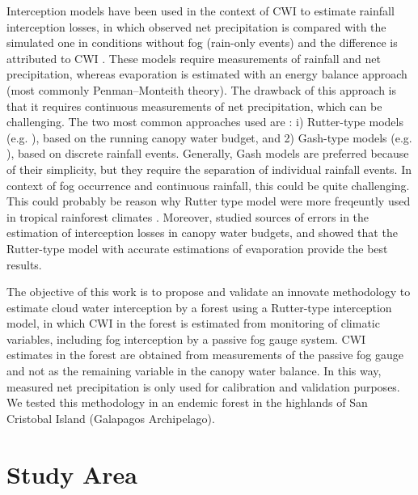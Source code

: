 \documentclass[a4paper,12pt]{article}
\begin{document}
\begin{linenumbers}
Interception models have been used in the context of CWI to estimate rainfall interception losses, in which observed net precipitation is compared with the simulated one in conditions without fog (rain-only events) and the difference is attributed to CWI \citep{Holwerdaetal2010, Pryetetal2012a}. These models require measurements of rainfall and net precipitation, whereas evaporation is estimated with an energy balance approach (most commonly Penman–Monteith theory). The drawback of this approach is that it requires continuous measurements of net precipitation, which can be challenging.  The two most common approaches used are \citep{Muzyloetal2009}:  i) Rutter-type models (e.g. \cite{Liu1997, Rutter1975}), based on the running canopy water budget, and 2) Gash-type models (e.g. \cite{Gash1979, Zengetal2000}), based on discrete rainfall events. Generally, Gash models are preferred because of their simplicity, but they require the separation of individual rainfall events. In context of fog occurrence and continuous rainfall, this could be quite challenging. This could probably be reason why Rutter type model were more freqeuntly used in tropical rainforest climates \citep{Muzyloetal2009}. Moreover, \cite{vanDijketal2015} studied sources of errors in the estimation of interception losses in canopy water budgets, and showed that the Rutter-type model with accurate estimations of evaporation provide the best results. 

The objective of this work is to propose and validate an innovate methodology to estimate cloud water interception by a forest using a Rutter-type interception model, in which CWI in the forest is estimated from monitoring of climatic variables, including fog interception by a passive fog gauge system. CWI estimates in the forest are obtained from measurements of the passive fog gauge and not as the remaining variable in the canopy water balance. In this way, measured net precipitation is only used for calibration and validation purposes. We tested this methodology in an endemic forest in the highlands of San Cristobal Island (Galapagos Archipelago). 

\section{Study Area}

\end{linenumbers}
\end{document}
